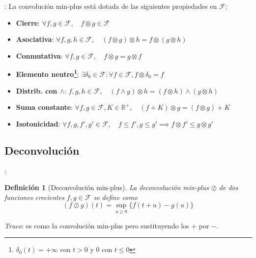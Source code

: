 \documentclass[xcolor={x11names}]{beamer}
\newtheorem{definicion}{Definición}[section]
\begin{document}
\begin{frame}{\secname: \subsecname}
    La convolución min-plus
    está dotada de las
    siguientes
    propiedades en $\mathcal{F}$:
    \begin{itemize}
        \item \textbf{Cierre}:
            $\forall f,g\in\mathcal{F},\quad f\otimes g\in\mathcal{F}$
        \pause
        \item \textbf{Asociativa}:
            $\forall f,g,h\in\mathcal{F},
            \quad 
            (f\otimes g)
            \otimes h
            =
            f\otimes
            (g\otimes h)$
        \pause
        \item \textbf{Conmutativa}:
            $\forall
            f,g\in\mathcal{F},
            \quad
            f\otimes g=
            g\otimes f$
        \pause
    \item \textbf{Elemento neutro\footnote{$\delta_0(t)=+\infty$ con $t>0$ y 0 con $t\leq0$}}:
            $\exists\delta_0\in\mathcal{F}: \forall f\in\mathcal{F},
            f\otimes\delta_0=f$
        \pause
    \item \textbf{Distrib. con $\land$}:
        $f,g,h\in\mathcal{F},
        \quad
        (f\land g)\otimes h
        = 
        (f\otimes h)
        \land
        (g\otimes h)$
    \pause
    \item \textbf{Suma constante}:
        $\forall f,g\in\mathcal{F},K\in\mathbb{R}^+,
        \quad
        (f+K)\otimes g
        =(f\otimes g) + K$

    \pause
    \item \textbf{Isotonicidad}:
        $\forall f,g,f',g'\in\mathcal{F},\quad
        f\leq f',g\leq g'
        \implies
        f\otimes f'
        \leq
        g\otimes g'$
    \end{itemize}
\end{frame}


\subsection{Deconvolución}
\begin{frame}{\secname: \subsecname}
    \begin{definicion}[Deconvolución min-plus]
        La deconvolución
        min-plus
        $\oslash$ de dos
        funciones crecientes
        $f,g\in\mathcal{F}$
        se define como
        \begin{equation}
            (f\oslash g)(t)
            =\sup_{u\geq0}
            \{f(t+u)-g(u)\}
        \end{equation}
    \end{definicion}

    \vfill

    \emph{Truco}:
    es como la convolución
    min-plus pero sustituyendo
    los $+$ por $-$.
\end{frame}
\end{document}
